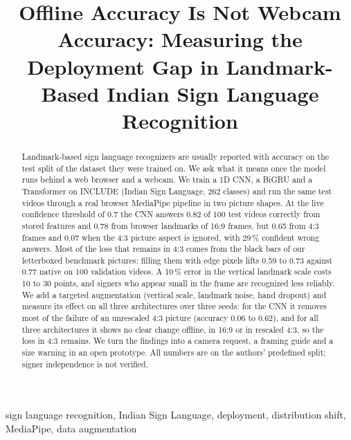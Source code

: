 \documentclass[conference]{IEEEtran}
\newcommand{\todo}[1]{{\color{blue}\textbf{[#1]}}}
\begin{document}
\title{Offline Accuracy Is Not Webcam Accuracy: Measuring the Deployment Gap in Landmark-Based Indian Sign Language Recognition}

\author{
\IEEEauthorblockA{Independent researcher\\
Email: \todo{author email}}}

\maketitle

\begin{abstract}
Landmark-based sign language recognizers are usually reported with accuracy on the test split of the dataset they were trained on. We ask what it means once the model runs behind a web browser and a webcam. We train a 1D CNN, a BiGRU and a Transformer on INCLUDE (Indian Sign Language, 262 classes) and run the same test videos through a real browser MediaPipe pipeline in two picture shapes. At the live confidence threshold of 0.7 the CNN answers 0.82 of 100 test videos correctly from stored features and 0.78 from browser landmarks of 16:9 frames, but 0.65 from 4:3 frames and 0.07 when the 4:3 picture aspect is ignored, with 29\,\% confident wrong answers. Most of the loss that remains in 4:3 comes from the black bars of our letterboxed benchmark pictures: filling them with edge pixels lifts 0.59 to 0.73 against 0.77 native on 100 validation videos. A 10\,\% error in the vertical landmark scale costs 10 to 30 points, and signers who appear small in the frame are recognized less reliably. We add a targeted augmentation (vertical scale, landmark noise, hand dropout) and measure its effect on all three architectures over three seeds: for the CNN it removes most of the failure of an unrescaled 4:3 picture (accuracy 0.06 to 0.62), and for all three architectures it shows no clear change offline, in 16:9 or in rescaled 4:3, so the loss in 4:3 remains. We turn the findings into a camera request, a framing guide and a size warning in an open prototype. All numbers are on the authors' predefined split; signer independence is not verified.
\end{abstract}

\begin{IEEEkeywords}
sign language recognition, Indian Sign Language, deployment, distribution shift, MediaPipe, data augmentation
\end{IEEEkeywords}
\end{document}

